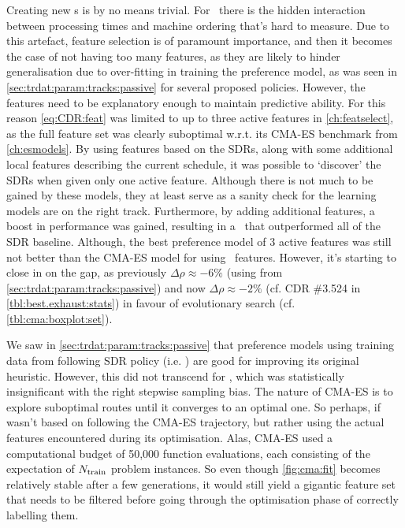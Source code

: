 Creating new \dr s is by no means trivial. For \jsp\ there is 
the hidden interaction between processing times and machine ordering that's 
hard to measure.
Due to this artefact, feature selection is of paramount importance, and then it 
becomes the case of not having too many features, as they are likely to hinder 
generalisation due to over-fitting in training the preference model, as was 
seen in \cref{sec:trdat:param:tracks:passive} for several proposed policies. 
However, the features need to be explanatory enough to maintain predictive 
ability. 
For this reason \cref{eq:CDR:feat} was limited to up to three active features 
in \cref{ch:featselect}, as the full feature set was clearly suboptimal 
w.r.t. its CMA-ES benchmark from \cref{ch:esmodels}. 
By using features based on the SDRs, along with some additional local features 
describing the current schedule, it was possible to `discover' the SDRs when 
given only one active feature. 
Although there is not much to be gained by these models, they at least serve as 
a sanity check for the learning models are on the right track. 
Furthermore, by adding additional features, a boost in performance was 
gained, resulting in a \cdr\ that outperformed all of the SDR baseline. 
Although, the best preference model of 3 active features was still not better 
than the CMA-ES model for  using \NrFeatLocal\ features. 
However, it's starting to close in on the gap, as previously 
$\Delta\rho\approx-6\%$ (using  from 
\cref{sec:trdat:param:tracks:passive}) and now $\Delta\rho\approx-2\%$ (cf. 
CDR \#3.524 in \cref{tbl:best.exhaust:stats}) in favour of evolutionary 
search (cf. \cref{tbl:cma:boxplot:set}).

We saw in \cref{sec:trdat:param:tracks:passive} that preference models using 
training data from following SDR policy (i.e. \PhiSet{\SDR}) are good for 
improving its original heuristic. However, this did not transcend for 
\PhiSet{\CMAES}, which was statistically insignificant with the right stepwise 
sampling bias.
The nature of CMA-ES is to explore suboptimal routes until it converges to an 
optimal one. So perhaps, if \PhiSet{\CMAES} wasn't based on following the 
CMA-ES trajectory, but rather using the actual features encountered during its 
optimisation. 
Alas, CMA-ES used a computational budget of 50,000 function evaluations, each 
consisting of the expectation of $N_{\text{train}}$ problem instances. 
So even though \cref{fig:cma:fit} becomes relatively stable after a few 
generations, it would still yield a gigantic feature set that needs to be 
filtered before going through the optimisation phase of correctly labelling 
them.

